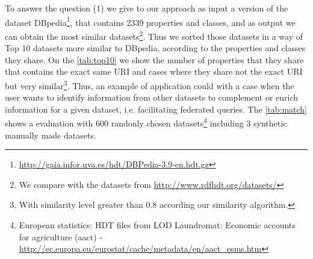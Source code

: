\documentclass[sw]{iosart2x}
\begin{document}

To answer the question (1) we give to our approach as input a version of the dataset DBpedia\footnote{\url{http://gaia.infor.uva.es/hdt/DBPedia-3.9-en.hdt.gz}}, that contains 2339 properties and classes, and as output we can obtain the most similar datasets\footnote{We compare with the datasets from \url{http://www.rdfhdt.org/datasets/}}. Thus we sorted those datasets in a way of Top 10 datasets more similar to DBpedia, according to the properties and classes they share. On the \cref{tab:top10} we show the number of properties that they share that contains the exact same URI and cases where they share not the exact URI but very similar\footnote{With similarity level greater than 0.8 according our similarity algorithm.}. Thus, an example of application could with a case when the user wants to identify information from other datasets to complement or enrich information for a given dataset, i.e. facilitating federated queries. The \cref{tab:match} shows a evaluation with 600 randonly chosen datasets\footnote{European statistics: HDT files from LOD Laundromat: Economic accounts for agriculture (aact) - \url{http://ec.europa.eu/eurostat/cache/metadata/en/aact_esms.htm}} including 3 synthetic manually made datasets.
\end{document}
